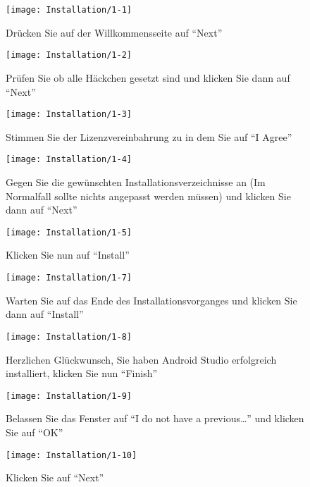 \begin{figure}
  \centering
  \texttt{[image: Installation/1-1]}
  \caption{Drücken Sie auf der Willkommensseite auf ``Next''}
\end{figure}

\begin{figure}
  \centering
  \texttt{[image: Installation/1-2]}
  \caption{Prüfen Sie ob alle Häckchen gesetzt sind und klicken Sie dann auf ``Next''}
\end{figure}

\begin{figure}
  \centering
  \texttt{[image: Installation/1-3]}
  \caption{Stimmen Sie der Lizenzvereinbahrung zu in dem Sie auf ``I Agree'' }
\end{figure}

\begin{figure}
  \centering
  \texttt{[image: Installation/1-4]}
  \caption{Gegen Sie die gewünschten Installationsverzeichnisse an (Im Normalfall sollte nichts angepasst werden müssen) und klicken Sie dann auf ``Next'' }
\end{figure}

\begin{figure}
  \centering
  \texttt{[image: Installation/1-5]}
  \caption{Klicken Sie nun auf ``Install'' }
\end{figure}

\begin{figure}
  \centering
  \texttt{[image: Installation/1-7]}
  \caption{Warten Sie auf das Ende des Installationsvorganges und klicken Sie dann auf ``Install'' }
\end{figure}

\begin{figure}
  \centering
  \texttt{[image: Installation/1-8]}
  \caption{Herzlichen Glückwunsch, Sie haben Android Studio erfolgreich installiert, klicken Sie nun ``Finish'' }
\end{figure}

\begin{figure}
  \centering
  \texttt{[image: Installation/1-9]}
  \caption{Belassen Sie das Fenster auf ``I do not have a previous\ldots'' und klicken Sie auf ``OK''}
\end{figure}

\begin{figure}
  \centering
  \texttt{[image: Installation/1-10]}
  \caption{Klicken Sie auf ``Next''}
\end{figure}

